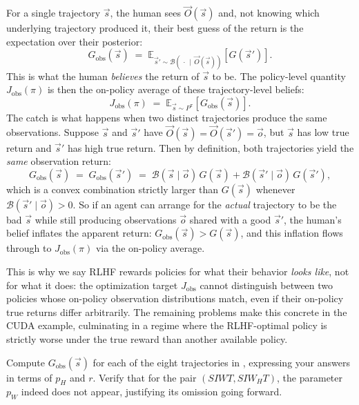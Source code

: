 \documentclass[11pt]{article}
\newcommand{\cB}{\mathcal{B}}
\newcommand{\E}{\mathbb{E}}
\newcommand{\Gobs}{G_{\mathrm{obs}}}
\newcommand{\Jobs}{J_{\mathrm{obs}}}
\begin{document}
\begin{solution}
For a single trajectory $\vec s$, the
human sees $\vec O(\vec s)$ and, not knowing which underlying trajectory
produced it, their best guess of the return is the expectation over their
posterior:
$$
\Gobs(\vec s) \;=\; \E_{\vec s' \sim \cB(\,\cdot\,\mid\, \vec O(\vec s))}[G(\vec s')].
$$
This is what the human \emph{believes} the return of $\vec s$ to be. The
policy-level quantity $\Jobs(\pi)$ is then the on-policy average of these
trajectory-level beliefs:
$$
\Jobs(\pi) \;=\; \E_{\vec s \sim P^\pi}[\Gobs(\vec s)].
$$
The catch is what happens when two distinct trajectories produce the
same observations. Suppose $\vec s$ and $\vec s'$ have
$\vec O(\vec s) = \vec O(\vec s') = \vec o$, but $\vec s$ has low true
return and $\vec s'$ has high true return. Then by definition, both
trajectories yield the \emph{same} observation return:
$$
\Gobs(\vec s) \;=\; \Gobs(\vec s') \;=\; \cB(\vec s \mid \vec o)\,G(\vec s) + \cB(\vec s' \mid \vec o)\,G(\vec s'),
$$
which is a convex combination strictly larger than $G(\vec s)$ whenever
$\cB(\vec s' \mid \vec o) > 0$. So if an agent can arrange for the
\emph{actual} trajectory to be the bad $\vec s$ while still producing
observations $\vec o$ shared with a good $\vec s'$, the human's belief
inflates the apparent return: $\Gobs(\vec s) > G(\vec s)$, and this
inflation flows through to $\Jobs(\pi)$ via the on-policy average.

This is why we say RLHF rewards policies for what their behavior
\emph{looks like}, not for what it does: the optimization target $\Jobs$
cannot distinguish between two policies whose on-policy observation
distributions match, even if their on-policy true returns differ
arbitrarily. The remaining problems make this concrete in the CUDA
example, culminating in a regime where the RLHF-optimal policy is
strictly worse under the true reward than another available policy.
\end{solution}


\begin{exercise}
\label{prob:Gobs}
Compute $\Gobs(\vec s)$ for each of the
eight trajectories in , expressing your answers in terms
of $p_H$ and $r$. Verify that for the pair $(SIWT, SIW_HT)$, the parameter
$p_W$ indeed does not appear, justifying its omission going forward.
\end{exercise}
\end{document}
